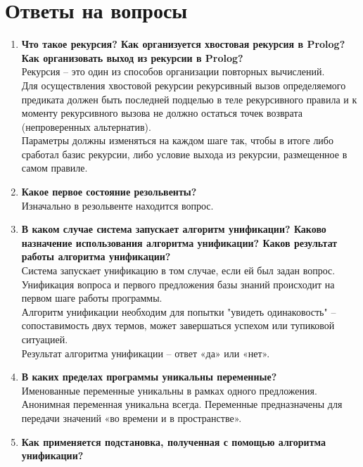 \newpage
\section*{Ответы на вопросы}
\begin{enumerate}
	\item \textbf{Что такое рекурсия? Как организуется хвостовая рекурсия в Prolog? Как организовать выход из рекурсии в Prolog?}\\
	Рекурсия – это один из способов организации повторных вычислений. \\  
	Для осуществления хвостовой рекурсии рекурсивный вызов определяемого предиката должен быть последней подцелью в теле рекурсивного правила и к моменту рекурсивного вызова не должно остаться точек возврата (непроверенных альтернатив). \\
	Параметры должны изменяться на каждом шаге так, чтобы в итоге либо сработал базис рекурсии, либо условие выхода из рекурсии, размещенное в самом правиле.
	    
	\item \textbf{Какое первое состояние резольвенты?}\\
	Изначально в резольвенте находится вопрос.
	
    \item \textbf{В каком случае система запускает алгоритм унификации? Каково назначение использования алгоритма унификации? Каков  результат работы алгоритма унификации?}\\ 
    Система запускает унификацию в том случае, если ей был задан вопрос. Унификация вопроса и первого предложения базы знаний происходит на первом шаге работы программы. \\
    Алгоритм унификации необходим для попытки "увидеть одинаковость" – сопоставимость двух термов, может завершаться успехом или тупиковой ситуацией. 
    \\
    Результат алгоритма унификации – ответ «да» или «нет». 

    \item \textbf{В каких пределах программы уникальны переменные? }\\
	Именованные переменные уникальны в рамках одного предложения. Анонимная переменная уникальна всегда. Переменные предназначены для передачи значений «во времени и в пространстве». 
	
	\item \textbf{\textbf{Как применяется подстановка, полученная с помощью алгоритма унификации?}}\\
	

\end{enumerate}
